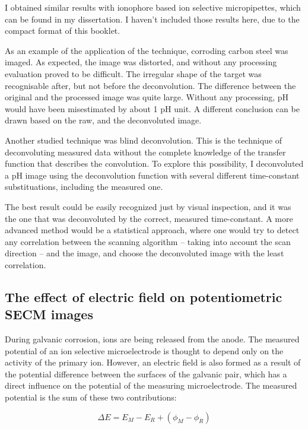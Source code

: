 I obtained similar results with ionophore based ion selective micropipettes, which can be found in my dissertation. I haven't included those results here, due to the compact format of this booklet.

As an example of the application of the technique, corroding carbon steel was imaged.
As expected, the image was distorted, and without any processing evaluation proved to be difficult.
The irregular shape of the target was recognisable after, but not before the deconvolution.
The difference between the original and the processed image was quite large.
Without any processing, pH would have been misestimated by about 1 pH unit.
A different conclusion can be drawn based on the raw, and the deconvoluted image.

Another studied technique was blind deconvolution. This is the technique of deconvoluting measured data without the complete knowledge of the transfer function that describes the convolution.
To explore this possibility, I deconvoluted a pH image using the deconvolution function with several different time-constant substituations, including the measured one.

The best result could be easily recognized just by visual inspection, and it was the one that was deconvoluted by the correct, measured time-constant.
A more advanced method would be a statistical approach, where one would try to detect any correlation between the scanning algorithm -- taking into account the scan direction -- and the image, and choose the deconvoluted image with the least correlation.

\subsection{The effect of electric field on potentiometric SECM images}

During galvanic corrosion, ions are being released from the anode.
The measured potential of an ion selective microelectrode is thought to depend only on the activity of the primary ion.
However, an electric field is also formed as a result of the potential difference between the surfaces of the galvanic pair, which has a direct influence on the potential of the measuring microelectrode. The measured potential is the sum of these two contributions:

\begin{equation}
\Delta E=E_M-E_R + (\phi_M - \phi_R)
\label{eq:potential}
\end{equation}

